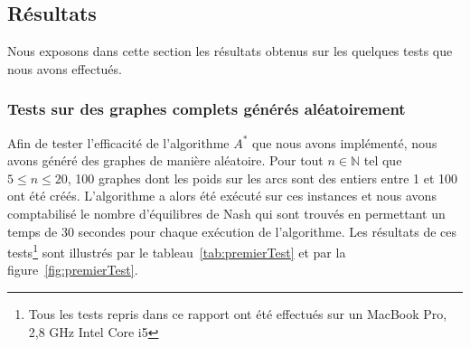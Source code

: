 
\subsection{Résultats}

Nous exposons dans cette section les résultats obtenus sur les quelques tests que nous avons effectués.

\subsubsection*{Tests sur des graphes complets générés aléatoirement}

Afin de tester l'efficacité de l'algorithme $A^*$ que nous avons implémenté, nous avons généré des graphes de manière aléatoire. Pour tout $n \in \mathbb{N}$ tel que $ 5 \leq n \leq 20$, 100 graphes dont les poids sur les arcs sont des entiers entre 1 et 100  ont été créés. L'algorithme a alors été exécuté sur ces instances et nous avons comptabilisé le nombre d'équilibres de Nash qui sont trouvés en permettant un temps de 30 secondes pour chaque exécution de l'algorithme. Les résultats de ces tests\footnote{Tous les tests repris dans ce rapport ont été effectués sur un MacBook Pro, 2,8 GHz Intel Core i5} sont illustrés par le tableau~\ref{tab:premierTest} et par la figure~\ref{fig:premierTest}.
\setlength{\overfullrule}{0pt}

